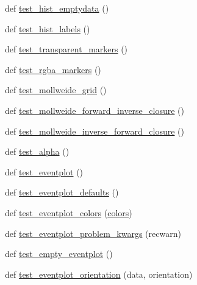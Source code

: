 \begin{DoxyCompactItemize}
\item 
def \hyperlink{namespacematplotlib_1_1tests_1_1test__axes_ad6d47130736d375b02e6499113df241e}{test\+\_\+hist\+\_\+emptydata} ()
\item 
def \hyperlink{namespacematplotlib_1_1tests_1_1test__axes_a6f13c7810af579e7f5b99118d29c7d2a}{test\+\_\+hist\+\_\+labels} ()
\item 
def \hyperlink{namespacematplotlib_1_1tests_1_1test__axes_a284dd98c138be22c75a7ede636c25957}{test\+\_\+transparent\+\_\+markers} ()
\item 
def \hyperlink{namespacematplotlib_1_1tests_1_1test__axes_af62f13d3926d111f23ef1976f57783ab}{test\+\_\+rgba\+\_\+markers} ()
\item 
def \hyperlink{namespacematplotlib_1_1tests_1_1test__axes_a4e51eeaa98243be0b6ac77d553f48245}{test\+\_\+mollweide\+\_\+grid} ()
\item 
def \hyperlink{namespacematplotlib_1_1tests_1_1test__axes_af49981bc3cb927ae4bfa8d4a986d5acb}{test\+\_\+mollweide\+\_\+forward\+\_\+inverse\+\_\+closure} ()
\item 
def \hyperlink{namespacematplotlib_1_1tests_1_1test__axes_aba470ce81c909cb814325bc5537ec5bb}{test\+\_\+mollweide\+\_\+inverse\+\_\+forward\+\_\+closure} ()
\item 
def \hyperlink{namespacematplotlib_1_1tests_1_1test__axes_a65405932d99833881f1eac7dda678912}{test\+\_\+alpha} ()
\item 
def \hyperlink{namespacematplotlib_1_1tests_1_1test__axes_a10a17fa76229cb82010afe13338407ed}{test\+\_\+eventplot} ()
\item 
def \hyperlink{namespacematplotlib_1_1tests_1_1test__axes_a39a4f83236596972f22e22f7c289a638}{test\+\_\+eventplot\+\_\+defaults} ()
\item 
def \hyperlink{namespacematplotlib_1_1tests_1_1test__axes_a42b24af5b1f1040e05d89d77aa613038}{test\+\_\+eventplot\+\_\+colors} (\hyperlink{namespacematplotlib_1_1tests_1_1test__axes_a1182a5d04ea4e47e42848266de939d2a}{colors})
\item 
def \hyperlink{namespacematplotlib_1_1tests_1_1test__axes_a6d14bfadccfb3a7cf57ae2bf76d43997}{test\+\_\+eventplot\+\_\+problem\+\_\+kwargs} (recwarn)
\item 
def \hyperlink{namespacematplotlib_1_1tests_1_1test__axes_a29706ae4dd9ad6695dd3a7d3d86ecf1d}{test\+\_\+empty\+\_\+eventplot} ()
\item 
def \hyperlink{namespacematplotlib_1_1tests_1_1test__axes_a9a7cc827ff8483e795e98fe9468a49fc}{test\+\_\+eventplot\+\_\+orientation} (data, orientation)

\end{DoxyCompactItemize}
